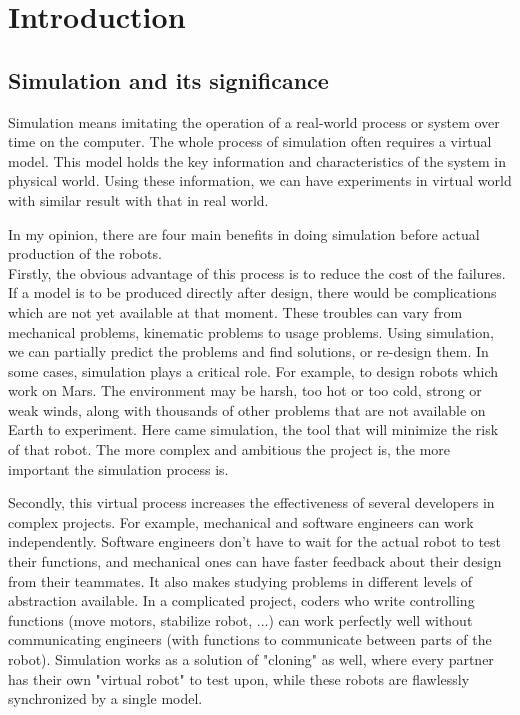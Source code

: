\documentclass[pdftex,12pt,a4paper]{article}
\begin{document}
  \newpage
  \section{Introduction}
  \subsection{Simulation and its significance}
  Simulation means imitating the operation of a real-world process or system over time on the computer. The whole process of simulation often requires a virtual model. This model holds the key information and characteristics of the system in physical world. Using these information, we can have experiments in virtual world with similar result with that in real world. \par
  In my opinion, there are four main benefits in doing simulation before actual production of the robots.\\
  Firstly, the obvious advantage of this process is to reduce the cost of the failures. If a model is to be produced directly after design, there would be complications which are not yet available at that moment. These troubles can vary from mechanical problems, kinematic problems to usage problems. Using simulation, we can partially predict the problems and find solutions, or re-design them. In some cases, simulation plays a critical role. For example, to design robots which work on Mars. The environment may be harsh, too hot or too cold, strong or weak winds, along with thousands of other problems that are not available on Earth to experiment. Here came simulation, the tool that will minimize the risk of that robot. The more complex and ambitious the project is, the more important the simulation process is.\par
  Secondly, this virtual process increases the effectiveness of several developers in complex projects. For example, mechanical and software engineers can work independently. Software engineers don't have to wait for the actual robot to test their functions, and mechanical ones can have faster feedback about their design from their teammates. It also makes studying problems in different levels of abstraction available. In a complicated project, coders who write controlling functions (move motors, stabilize robot, ...) can work perfectly well without communicating engineers (with functions to communicate between parts of the robot). Simulation works as a solution of "cloning" as well, where every partner has their own "virtual robot" to test upon, while these robots are flawlessly synchronized by a single model.\par
  
\end{document}
